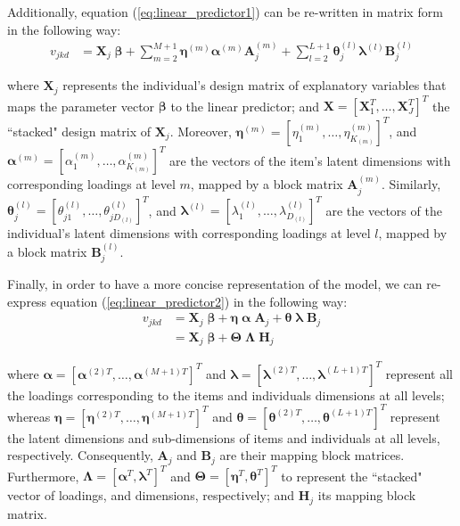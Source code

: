 Additionally, equation (\ref{eq:linear_predictor1}) can be re-written in matrix form in the following way:
%
\begin{equation} \label{eq:linear_predictor2}
	\begin{split}
		v_{jkd} &= \mathbf{X}_{j} \; \pmb{\beta} + \sum_{m=2}^{M+1} \pmb{\eta}^{(m)} \pmb{\alpha}^{(m)} \mathbf{A}_{j}^{(m)} + \sum_{l=2}^{L+1} \pmb{\theta}_{j}^{(l)} \pmb{\lambda}^{(l)} \mathbf{B}_{j}^{(l)}
	\end{split}
\end{equation}

\noindent where $\mathbf{X}_{j}$ represents the individual's design matrix of explanatory variables that maps the parameter vector $\pmb{\beta}$ to the linear predictor; and $\mathbf{X} = [ \mathbf{X}_{1}^{T}, \dots, \mathbf{X}_{J}^{T} ]^{T}$ the ``stacked" design matrix of $\mathbf{X}_{j}$. Moreover, $\pmb{\eta}^{(m)} = [ \eta_{1}^{(m)}, \dots, \eta_{K_{(m)}}^{(m)} ]^{T}$, and  $\pmb{\alpha}^{(m)} = [ \alpha_{1}^{(m)}, \dots, \alpha_{K_{(m)}}^{(m)} ]^{T}$ are the vectors of the item's latent dimensions with corresponding loadings at level $m$, mapped by a block matrix $\mathbf{A}_{j}^{(m)}$. Similarly, $\pmb{\theta}_{j}^{(l)} = [ \theta_{j1}^{(l)}, \dots, \theta_{jD_{(l)}}^{(l)} ]^{T}$, and  $\pmb{\lambda}^{(l)} = [ \lambda_{1}^{(l)}, \dots, \lambda_{D_{(l)}}^{(l)} ]^{T}$ are the vectors of the individual's latent dimensions with corresponding loadings at level $l$, mapped by a block matrix $\mathbf{B}_{j}^{(l)}$.

Finally, in order to have a more concise representation of the model, we can re-express equation (\ref{eq:linear_predictor2}) in the following way:
%
\begin{equation} \label{eq:linear_predictor3}
	\begin{split}
		v_{jkd} &= \mathbf{X}_{j} \; \pmb{\beta} + \pmb{\eta} \; \pmb{\alpha} \; \mathbf{A}_{j} + \pmb{\theta} \; \pmb{\lambda} \; \mathbf{B}_{j} \\
		&= \mathbf{X}_{j} \; \pmb{\beta} + \pmb{\Theta} \; \pmb{\Lambda} \; \mathbf{H}_{j}
	\end{split}
\end{equation}

\noindent where $\pmb{\alpha} = [ \pmb{\alpha}^{(2)T}, \dots, \pmb{\alpha}^{(M+1)T} ]^{T}$ and $\pmb{\lambda} = [ \pmb{\lambda}^{(2)T}, \dots, \pmb{\lambda}^{(L+1)T} ]^{T}$ represent all the loadings corresponding to the items and individuals dimensions at all levels; whereas $\pmb{\eta} = [ \pmb{\eta}^{(2)T}, \dots, \pmb{\eta}^{(M+1)T} ]^{T}$ and $\pmb{\theta} = [ \pmb{\theta}^{(2)T}, \dots, \pmb{\theta}^{(L+1)T} ]^{T}$ represent the latent dimensions and sub-dimensions of items and individuals at all levels, respectively. Consequently, $\mathbf{A}_{j}$ and $\mathbf{B}_{j}$ are their mapping block matrices. Furthermore, $\pmb{\Lambda} = [ \pmb{\alpha}^{T}, \pmb{\lambda}^{T} ]^{T}$ and $\pmb{\Theta} = [ \pmb{\eta}^{T}, \pmb{\theta}^{T} ]^{T}$ to represent the ``stacked" vector of loadings, and dimensions, respectively; and $\mathbf{H}_{j}$ its mapping block matrix.

